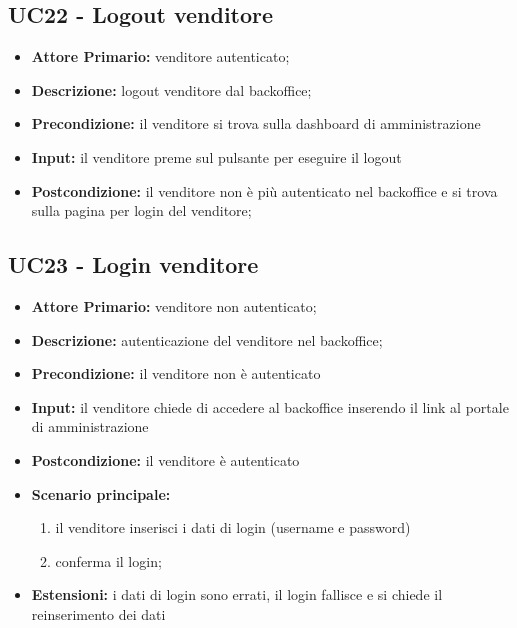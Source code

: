 \subsection{UC22 - Logout venditore}
\label{UC22}
\begin{itemize}
    \item \textbf{Attore Primario:} venditore autenticato;
    \item \textbf{Descrizione:} logout venditore dal backoffice;
    \item \textbf{Precondizione:} il venditore si trova sulla dashboard di amministrazione
    \item \textbf{Input:} il venditore preme sul pulsante per eseguire il logout
    \item \textbf{Postcondizione:} il venditore non è più autenticato nel backoffice e si trova sulla pagina per login del venditore;
\end{itemize}


\subsection{UC23 - Login venditore}
\label{UC23}
\begin{itemize}
    \item \textbf{Attore Primario:} venditore non autenticato;
    \item \textbf{Descrizione:} autenticazione del venditore nel backoffice;
    \item \textbf{Precondizione:} il venditore non è autenticato
    \item \textbf{Input:} il venditore chiede di accedere al backoffice inserendo il link al portale di amministrazione
    \item \textbf{Postcondizione:} il venditore è autenticato
    \item \textbf{Scenario principale:}
    \begin{enumerate}
        \item il venditore inserisci i dati di login (username e password)
        \item conferma il login;
    \end{enumerate}
    \item \textbf{Estensioni:} i dati di login sono errati, il login fallisce e si chiede il reinserimento dei dati
\end{itemize}
